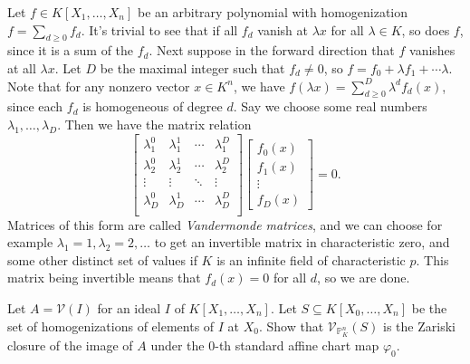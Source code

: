 \documentclass[11pt,letterpaper]{article}
\begin{document}
\begin{solution}
    Let $f\in K[X_1,\ldots,X_n]$ be an arbitrary polynomial with homogenization $f = \sum_{d\geq 0} f_d$.  It's trivial to see that if all $f_d$ vanish at $\lambda x$ for all $\lambda\in K$, so does $f$, since it is a sum of the $f_d$. Next suppose in the forward direction that $f$ vanishes at all $\lambda x$. Let $D$ be the maximal integer such that $f_d\neq 0$, so $f = f_0 + \lambda f_1 +\cdots \lambda$. Note that for any nonzero vector $x\in K^n$, we have $f(\lambda x)=\sum^D_{d\geq 0}\lambda^d f_d(x)$, since each $f_d$ is homogeneous of degree $d$. Say we choose some real numbers $\lambda_1,\ldots,\lambda_D$. Then we have the matrix relation
    \[
        \begin{bmatrix}
            \lambda_1^0 & \lambda_1^1 & \cdots & \lambda_1^D\\
            \lambda_2^0 & \lambda_2^1 & \cdots & \lambda_2^D\\
            \vdots & \vdots & \ddots & \vdots \\
            \lambda_D^0 & \lambda_D^1 & \cdots & \lambda_D^D\\
        \end{bmatrix}\begin{bmatrix}
            f_0(x)\\ f_1(x)\\ \vdots\\ f_D(x)
        \end{bmatrix} = 0.
    \] 
    Matrices of this form are called \emph{Vandermonde matrices}, and we can choose for example $\lambda_1=1, \lambda_2=2, \ldots$ to get an invertible matrix in characteristic zero, and some other distinct set of values if $K$ is an infinite field of characteristic $p$. This matrix being invertible means that $f_d(x)=0$ for all $d$, so we are done. 
\end{solution}

\begin{problem}
    Let $A=\mathcal V(I)$ for an ideal $I$ of $K[X_1,\dots,X_n]$. Let $S\subseteq K[X_0,\dots,X_n]$ be the set of homogenizations of elements of $I$ at $X_0$. Show that $\mathcal V_{\mathbb P^n_K}(S)$ is the Zariski closure of the image of $A$ under the $0$-th standard affine chart map $\varphi_0$.
\end{problem}
\end{document}
